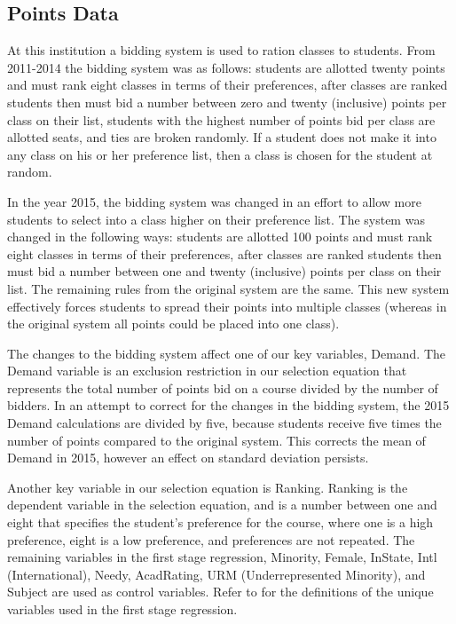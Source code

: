 \clearpage{}

\subsection{Points Data}\label{data:pointsdata}

At this institution a bidding system is used to ration classes to students. 
From 2011-2014 the bidding system was as follows: 
students are allotted twenty points and must rank eight classes in terms of their preferences, 
after classes are ranked students then must bid a number between zero and twenty (inclusive) points per class on their list, 
students with the highest number of points bid per class are allotted seats, and ties are broken randomly. 
If a student does not make it into any class on his or her preference list, then a class is chosen for the student at random. 

In the year 2015, the bidding system was changed in an effort to allow more students to select into a class higher on their preference list. 
The system was changed in the following ways:
students are allotted 100 points and must rank eight classes in terms of their preferences,
after classes are ranked students then must bid a number between one and twenty (inclusive) points per class on their list.
The remaining rules from the original system are the same. 
This new system effectively forces students to spread their points into multiple classes (whereas in the original system all points could be placed into one class).

The changes to the bidding system affect one of our key variables, Demand. 
The Demand variable is an exclusion restriction in our selection equation that represents the total number of points bid on a course divided by the number of bidders. 
In an attempt to correct for the changes in the bidding system, the 2015 Demand calculations are divided by five, because students receive five times the number of points compared to the original system. 
This corrects the mean of Demand in 2015, however an effect on standard deviation persists. 

Another key variable in our selection equation is Ranking. 
Ranking is the dependent variable in the selection equation, and is a number between one and eight that specifies the student's preference for the course, where one is a high preference, eight is a low preference, and preferences are not repeated. 
The remaining variables in the first stage regression, Minority, Female, InState, Intl (International), Needy, AcadRating, URM (Underrepresented Minority), and Subject are used as control variables. Refer to  for the definitions of the unique variables used in the first stage regression. 

